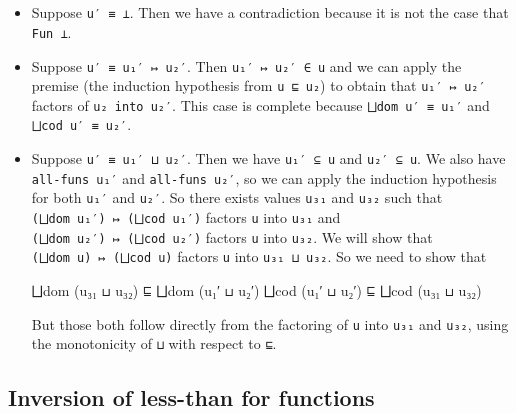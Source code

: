 \begin{fence}
\begin{code}
\<%
\\
%
\>[10]\AgdaSpace{}%
\AgdaSymbol{\{}\AgdaSymbol{\}}\AgdaSpace{}%
\AgdaSymbol{(}\AgdaSpace{}%
\AgdaSymbol{)}\AgdaSpace{}%
\AgdaSymbol{=}\AgdaSpace{}%
\AgdaSpace{}%
\<%
\\
%
\>[10]\AgdaSpace{}%
\AgdaSymbol{\{}\AgdaSymbol{\}}\AgdaSpace{}%
\AgdaSymbol{(}\AgdaSpace{}%
\AgdaSymbol{)}\AgdaSpace{}%
\AgdaSymbol{=}\AgdaSpace{}%
\AgdaSpace{}%
\<%
\end{code}
\end{fence}

\begin{itemize}
\item
  Suppose \texttt{u′\ ≡\ ⊥}. Then we have a contradiction because it is
  not the case that \texttt{Fun\ ⊥}.
\item
  Suppose \texttt{u′\ ≡\ u₁′\ ↦\ u₂′}. Then \texttt{u₁′\ ↦\ u₂′\ ∈\ u}
  and we can apply the premise (the induction hypothesis from
  \texttt{u\ ⊑\ u₂}) to obtain that \texttt{u₁′\ ↦\ u₂′} factors of
  \texttt{u₂\ into\ u₂′}. This case is complete because
  \texttt{⨆dom\ u′\ ≡\ u₁′} and \texttt{⨆cod\ u′\ ≡\ u₂′}.
\item
  Suppose \texttt{u′\ ≡\ u₁′\ ⊔\ u₂′}. Then we have \texttt{u₁′\ ⊆\ u}
  and \texttt{u₂′\ ⊆\ u}. We also have \texttt{all-funs\ u₁′} and
  \texttt{all-funs\ u₂′}, so we can apply the induction hypothesis for
  both \texttt{u₁′} and \texttt{u₂′}. So there exists values
  \texttt{u₃₁} and \texttt{u₃₂} such that
  \texttt{(⨆dom\ u₁′)\ ↦\ (⨆cod\ u₁′)} factors \texttt{u} into
  \texttt{u₃₁} and \texttt{(⨆dom\ u₂′)\ ↦\ (⨆cod\ u₂′)} factors
  \texttt{u} into \texttt{u₃₂}. We will show that
  \texttt{(⨆dom\ u)\ ↦\ (⨆cod\ u)} factors \texttt{u} into
  \texttt{u₃₁\ ⊔\ u₃₂}. So we need to show that

  \begin{myDisplay}
    ⨆dom (u₃₁ ⊔ u₃₂) ⊑ ⨆dom (u₁′ ⊔ u₂′)
    ⨆cod (u₁′ ⊔ u₂′) ⊑ ⨆cod (u₃₁ ⊔ u₃₂)
  \end{myDisplay}

  But those both follow directly from the factoring of \texttt{u} into
  \texttt{u₃₁} and \texttt{u₃₂}, using the monotonicity of \texttt{⊔}
  with respect to \texttt{⊑}.
\end{itemize}

\hypertarget{inversion-of-less-than-for-functions}{%
\subsection{Inversion of less-than for
functions}\label{inversion-of-less-than-for-functions}}

